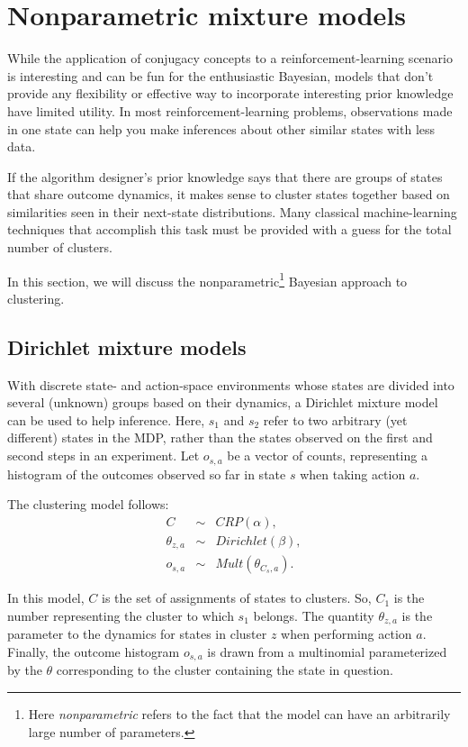 \section{Nonparametric mixture models}
\label{models:npm}

While the application of conjugacy concepts to a reinforcement-learning scenario is interesting and can be fun for the enthusiastic Bayesian, models that don't provide any flexibility or effective way to incorporate interesting prior knowledge have limited utility. In most reinforcement-learning problems, observations made in one state can help you make inferences about other similar states with less data.

If the algorithm designer's prior knowledge says that there are groups of states that share outcome dynamics, it makes sense to cluster states together based on similarities seen in their next-state distributions. Many classical machine-learning techniques that accomplish this task must be provided with a guess for the total number of clusters.

In this section, we will discuss the nonparametric\footnote{Here \emph{nonparametric} refers to the fact that the model can have an arbitrarily large number of parameters.} Bayesian approach to clustering.

\subsection{Dirichlet mixture models}

With discrete state- and action-space environments whose states are divided into several (unknown) groups based on their dynamics, a Dirichlet mixture model can be used to help inference. Here, $s_1$ and $s_2$ refer to two arbitrary (yet different) states in the MDP, rather than the states observed on the first and second steps in an experiment. Let $o_{s,a}$ be a vector of counts, representing a histogram of the outcomes observed so far in state $s$ when taking action $a$.

The clustering model follows:
\begin{eqnarray}
C &\sim& CRP(\alpha),\\
\theta_{z,a} &\sim& Dirichlet(\beta),\\
o_{s,a} &\sim& Mult(\theta_{C_s,a}).
\end{eqnarray}

In this model, $C$ is the set of assignments of states to clusters. So, $C_1$ is the number representing the cluster to which $s_1$ belongs. The quantity $\theta_{z,a}$ is the parameter to the dynamics for states in cluster $z$ when performing action $a$. Finally, the outcome histogram $o_{s,a}$ is drawn from a multinomial parameterized by the $\theta$ corresponding to the cluster containing the state in question.

